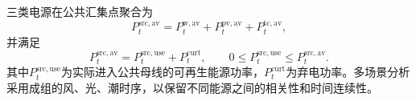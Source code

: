 三类电源在公共汇集点聚合为
\begin{equation}
P_t^{\mathrm{src,av}}
=P_t^{\mathrm{w,av}}+P_t^{\mathrm{pv,av}}+P_t^{\mathrm{tc,av}},
\label{eq:source-aggregate}
\end{equation}
并满足
\begin{equation}
P_t^{\mathrm{src,av}}
=P_t^{\mathrm{src,use}}+P_t^{\mathrm{curt}},
\qquad
0\le P_t^{\mathrm{src,use}}\le P_t^{\mathrm{src,av}}.
\label{eq:source-use-curt}
\end{equation}
其中$P_t^{\mathrm{src,use}}$为实际进入公共母线的可再生能源功率，$P_t^{\mathrm{curt}}$为弃电功率。多场景分析采用成组的风、光、潮时序，以保留不同能源之间的相关性和时间连续性。
